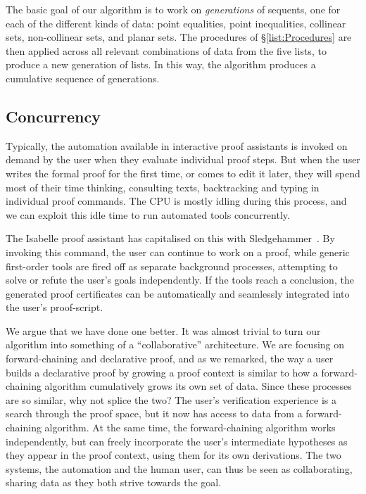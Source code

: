 The basic goal of our algorithm is to work on \emph{generations} of sequents, one for each of the different kinds of data: point equalities, point inequalities, collinear sets, non-collinear sets, and planar sets. The procedures of \S\ref{list:Procedures} are then applied across all relevant combinations of data from the five lists, to produce a new generation of lists. In this way, the algorithm produces a cumulative sequence of generations.

\subsection{Concurrency}\label{sec:NaiveConcurrency}
Typically, the automation available in interactive proof assistants is invoked on demand by the user when they evaluate individual proof steps. But when the user writes the formal proof for the first time, or comes to edit it later, they will spend most of their time thinking, consulting texts, backtracking and typing in individual proof commands. The CPU is mostly idling during this process, and we can exploit this idle time to run automated tools concurrently.

The Isabelle proof assistant has capitalised on this with Sledgehammer~\cite{IsabelleSledgehammer}. By invoking this command, the user can continue to work on a proof, while generic first-order tools are fired off as separate background processes, attempting to solve or refute the user's goals independently. If the tools reach a conclusion, the generated proof certificates can be automatically and seamlessly integrated into the user's proof-script. 

We argue that we have done one better. It was almost trivial to turn our algorithm into something of a ``collaborative'' architecture. We are focusing on forward-chaining and declarative proof, and as we remarked, the way a user builds a declarative proof by growing a proof context is similar to how a forward-chaining algorithm cumulatively grows its own set of data. Since these processes are so similar, why not splice the two? The user's verification experience is a search through the proof space, but it now has access to data from a forward-chaining algorithm. At the same time, the forward-chaining algorithm works independently, but can freely incorporate the user's intermediate hypotheses as they appear in the proof context, using them for its own derivations. The two systems, the automation and the human user, can thus be seen as collaborating, sharing data as they both strive towards the goal. 

